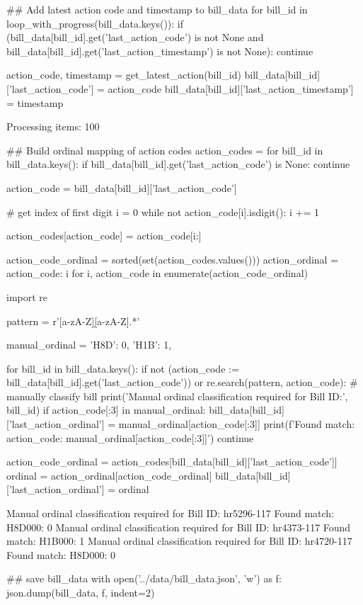 \begin{pyin}
\## Add latest action code and timestamp to bill_data
for bill_id in loop_with_progress(bill_data.keys()):
    if (bill_data[bill_id].get('last_action_code') is not None
            and bill_data[bill_id].get('last_action_timestamp') is not None):
        continue

    action_code, timestamp = get_latest_action(bill_id)
    bill_data[bill_id]['last_action_code'] = action_code
    bill_data[bill_id]['last_action_timestamp'] = timestamp
\end{pyin}

\begin{pyprint}
Processing items: 100%
\end{pyprint}

\begin{pyin}
\## Build ordinal mapping of action codes
action_codes = {}
for bill_id in bill_data.keys():
    if bill_data[bill_id].get('last_action_code') is None:
        continue

    action_code = bill_data[bill_id]['last_action_code']

    # get index of first digit
    i = 0
    while not action_code[i].isdigit():
        i += 1

    action_codes[action_code] = action_code[i:]

action_code_ordinal = sorted(set(action_codes.values()))
action_ordinal = {action_code: i for i, action_code in enumerate(action_code_ordinal)}
\end{pyin}

\begin{pyin}
import re

pattern = r'[a-zA-Z]\d[a-zA-Z].*'

manual_ordinal = {
    'H8D': 0,
    'H1B': 1,
}

for bill_id in bill_data.keys():
    if not (action_code := bill_data[bill_id].get('last_action_code')) or re.search(pattern, action_code):
        # manually classify bill
        print('Manual ordinal classification required for Bill ID:', bill_id)
        if action_code[:3] in manual_ordinal:
            bill_data[bill_id]['last_action_ordinal'] = manual_ordinal[action_code[:3]]
            print(f'Found match: {action_code}: {manual_ordinal[action_code[:3]]}')
        continue

    action_code_ordinal = action_codes[bill_data[bill_id]['last_action_code']]
    ordinal = action_ordinal[action_code_ordinal]
    bill_data[bill_id]['last_action_ordinal'] = ordinal
\end{pyin}

\begin{pyprint}
Manual ordinal classification required for Bill ID: hr5296-117
Found match: H8D000: 0
Manual ordinal classification required for Bill ID: hr4373-117
Found match: H1B000: 1
Manual ordinal classification required for Bill ID: hr4720-117
Found match: H8D000: 0
\end{pyprint}

\begin{pyin}
\## save bill_data
with open('../data/bill_data.json', 'w') as f:
    json.dump(bill_data, f, indent=2)
\end{pyin}
